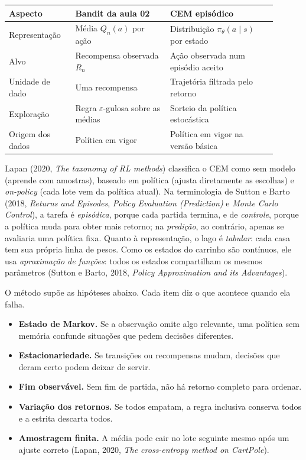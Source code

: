 \documentclass[12pt]{article}
\begin{document}
\begin{center}
\small
\begin{tabular}{>{\raggedright\arraybackslash}p{0.22\linewidth}>{\raggedright\arraybackslash}p{0.32\linewidth}>{\raggedright\arraybackslash}p{0.36\linewidth}}
\toprule
Aspecto & Bandit da aula 02 & CEM episódico\\
\midrule
Representação & Média $Q_n(a)$ por ação & Distribuição $\pi_\theta(a\mid s)$ por estado\\
Alvo & Recompensa observada $R_n$ & Ação observada num episódio aceito\\
Unidade de dado & Uma recompensa & Trajetória filtrada pelo retorno\\
Exploração & Regra $\varepsilon$-gulosa sobre as médias & Sorteio da política estocástica\\
Origem dos dados & Política em vigor & Política em vigor na versão básica\\
\bottomrule
\end{tabular}
\end{center}

Lapan (2020, \emph{The taxonomy of RL methods}) classifica o CEM como sem modelo (aprende com amostras), baseado em política (ajusta diretamente as escolhas) e \emph{on-policy} (cada lote vem da política atual). Na terminologia de Sutton e Barto (2018, \emph{Returns and Episodes}, \emph{Policy Evaluation (Prediction)} e \emph{Monte Carlo Control}), a tarefa é \emph{episódica}, porque cada partida termina, e de \emph{controle}, porque a política muda para obter mais retorno; na \emph{predição}, ao contrário, apenas se avaliaria uma política fixa. Quanto à representação, o lago é \emph{tabular}: cada casa tem sua própria linha de pesos. Como os estados do carrinho são contínuos, ele usa \emph{aproximação de funções}: todos os estados compartilham os mesmos parâmetros (Sutton e Barto, 2018, \emph{Policy Approximation and its Advantages}).

O método supõe as hipóteses abaixo. Cada item diz o que acontece quando ela falha.
\begin{itemize}
\item \textbf{Estado de Markov.} Se a observação omite algo relevante, uma política sem memória confunde situações que pedem decisões diferentes.
\item \textbf{Estacionariedade.} Se transições ou recompensas mudam, decisões que deram certo podem deixar de servir.
\item \textbf{Fim observável.} Sem fim de partida, não há retorno completo para ordenar.
\item \textbf{Variação dos retornos.} Se todos empatam, a regra inclusiva conserva todos e a estrita descarta todos.
\item \textbf{Amostragem finita.} A média pode cair no lote seguinte mesmo após um ajuste correto (Lapan, 2020, \emph{The cross-entropy method on CartPole}).
\end{itemize}
\end{document}
